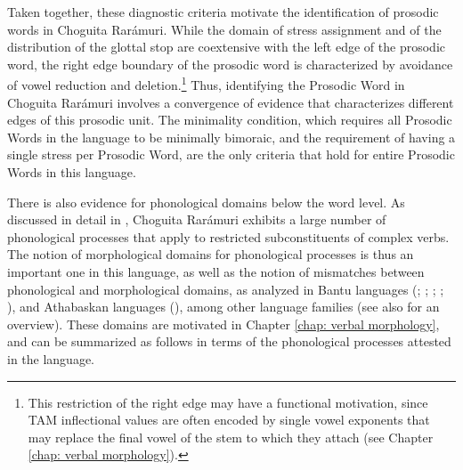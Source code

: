 Taken together, these diagnostic criteria motivate the identification of prosodic words in Choguita Rarámuri. While the domain of stress assignment and of the distribution of the glottal stop are coextensive with the left edge of the prosodic word, the right edge boundary of the prosodic word is characterized by avoidance of vowel reduction and deletion.\footnote{This restriction of the right edge may have a functional motivation, since TAM inflectional values are often encoded by single vowel exponents that may replace the final vowel of the stem to which they attach (see Chapter \ref{chap: verbal morphology}).} Thus, identifying the Prosodic Word in Choguita Rarámuri involves a convergence of evidence that characterizes different edges of this prosodic unit. The minimality condition, which requires all Prosodic Words in the language to be minimally bimoraic, and the requirement of having a single stress per Prosodic Word, are the only criteria that hold for entire Prosodic Words in this language.

There is also evidence for phonological domains below the word level. As discussed in detail in , Choguita Rarámuri exhibits a large number of phonological processes that apply to restricted subconstituents of complex verbs. The notion of morphological domains for phonological processes is thus an important one in this language, as well as the notion of mismatches between phonological and morphological domains, as analyzed in Bantu languages (\citealt{hyman1987prosodic,hyman1998positional,hyman2008directional}; \citealt{odden1996phonology}; \citealt{myers1998surface}; \citealt{downing2001generalizable}; \citealt{bickmore2007cilungu}), and Athabaskan languages (\citealt{mcdonough2000bipartite}), among other language families (see also \citealt{inkelas2014interplay} for an overview). These domains are motivated in Chapter \ref{chap: verbal morphology}, and can be summarized as follows in terms of the phonological processes attested in the language.

